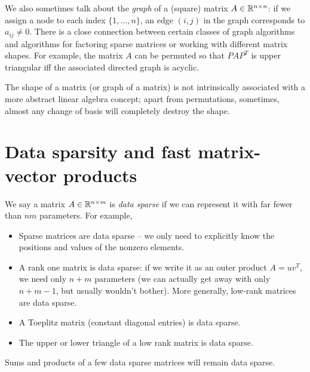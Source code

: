 \documentclass[12pt, leqno]{article}
\begin{document}
We also sometimes talk about the {\em graph} of a (square) matrix
$A \in \mathbb{R}^{n \times n}$: if we assign a node to each index
$\{1, \ldots, n\}$, an edge $(i,j)$ in the graph corresponds
to $a_{ij} \neq 0$.  There is a close connection between certain
classes of graph algorithms and algorithms for factoring sparse
matrices or working with different matrix shapes.  For example,
the matrix $A$ can be permuted so that $P A P^T$ is upper triangular
iff the associated directed graph is acyclic.

The shape of a matrix (or graph of a matrix) is not intrinsically
associated with a more abstract linear algebra concept; apart from
permutations, sometimes, almost any change of basis will completely
destroy the shape.

\section*{Data sparsity and fast matrix-vector products}

We say a matrix $A \in \mathbb{R}^{n \times m}$ is {\em data sparse} if we
can represent it with far fewer than $nm$ parameters.  For example,
\begin{itemize}
\item Sparse matrices are data sparse -- we only need to explicitly
  know the positions and values of the nonzero elements.
\item A rank one matrix is data sparse: if we write it as an outer
  product $A = uv^T$, we need only $n+m$ parameters (we can actually
  get away with only $n+m-1$, but usually wouldn't bother).  More
  generally, low-rank matrices are data sparse.
\item A Toeplitz matrix (constant diagonal entries) is data sparse.
\item The upper or lower triangle of a low rank matrix is data sparse.
\end{itemize}
Sums and products of a few data sparse matrices
will remain data sparse.
\end{document}
